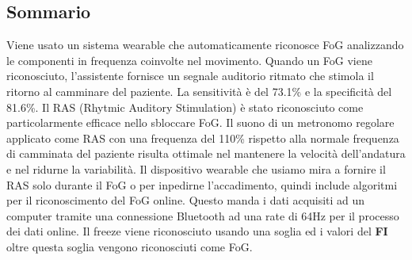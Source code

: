 \documentclass[a4paper,11pt]{article} %
\begin{document}
\subsection{Sommario}
Viene usato un sistema wearable che automaticamente riconosce FoG analizzando le componenti in frequenza coinvolte nel movimento. Quando un FoG viene riconosciuto, l'assistente fornisce un segnale auditorio ritmato che stimola il ritorno al camminare del paziente. La sensitività è del 73.1\% e la specificità del 81.6\%.
Il RAS (Rhytmic Auditory Stimulation) è stato riconosciuto come particolarmente efficace nello sbloccare FoG. Il suono di un metronomo regolare applicato come RAS con una frequenza del 110\% rispetto alla normale frequenza di camminata del paziente risulta ottimale nel mantenere la velocità dell'andatura e nel ridurne la variabilità. Il dispositivo wearable che usiamo mira a fornire il RAS solo durante il FoG o per inpedirne l'accadimento, quindi include algoritmi per il riconoscimento del FoG online. Questo manda i dati acquisiti ad un computer tramite una connessione Bluetooth ad una rate di 64Hz per il processo dei dati online. Il freeze viene riconosciuto usando una soglia ed i valori del \textbf{FI} oltre questa soglia vengono riconosciuti come FoG.\linebreak
\end{document}
